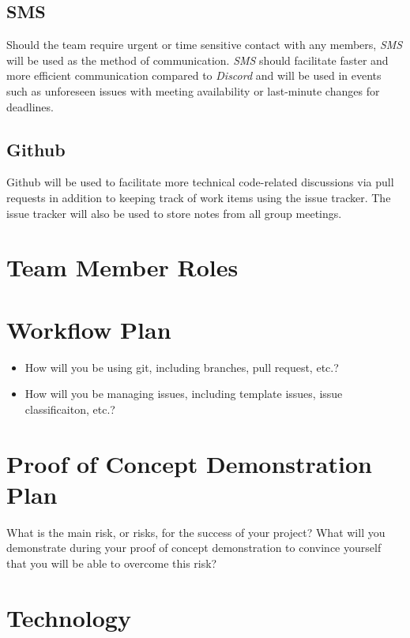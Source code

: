 \documentclass{article}
\begin{document}
\subsection{SMS}

Should the team require urgent or time sensitive contact with any members, \emph{SMS} will be used as the method 
of communication. \emph{SMS} should facilitate faster and more efficient communication compared to \emph{Discord} 
and will be used in events such as unforeseen issues with meeting availability or last-minute changes for deadlines.

\subsection{Github}

Github will be used to facilitate more technical code-related discussions via pull requests in addition to 
keeping track of work items using the issue tracker. The issue tracker will also be used to store notes from 
all group meetings.

\section{Team Member Roles}

\section{Workflow Plan}

\begin{itemize}
	\item How will you be using git, including branches, pull request, etc.?
	\item How will you be managing issues, including template issues, issue
	classificaiton, etc.?
\end{itemize}

\section{Proof of Concept Demonstration Plan}

What is the main risk, or risks, for the success of your project?  What will you
demonstrate during your proof of concept demonstration to convince yourself that
you will be able to overcome this risk?

\section{Technology}
\end{document}
